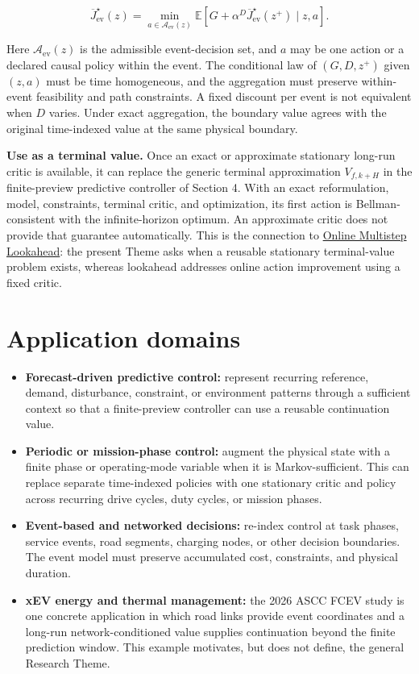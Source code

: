 \documentclass[a4paper]{article}
\begin{document}
\begin{equation}
  \overline J_{\mathrm{ev}}^\star(z)
  =
  \min_{a\in\mathcal A_{\mathrm{ev}}(z)}
  \mathbb E
  \!\left[
  G
  +
  \alpha^D\overline J_{\mathrm{ev}}^\star(z^+)
  \mid z,a
  \right].
\end{equation}

Here $\mathcal A_{\mathrm{ev}}(z)$ is the admissible event-decision set, and
$a$ may be one action or a declared causal policy within the event. The
conditional law of $(G,D,z^+)$ given $(z,a)$ must be time homogeneous, and the
aggregation must preserve within-event feasibility and path constraints. A
fixed discount per event is not equivalent when $D$ varies. Under exact
aggregation, the boundary value agrees with the original time-indexed value at
the same physical boundary.

\textbf{Use as a terminal value.} Once an exact or approximate stationary
long-run critic is available, it can replace the generic terminal
approximation $V_{f,k+H}$ in the finite-preview predictive controller of
Section 4. With an exact reformulation, model,
constraints, terminal critic, and optimization, its first action is
Bellman-consistent with the infinite-horizon optimum. An approximate critic
does not provide that guarantee automatically. This is the connection to
\href{https://kaist-mic-lab.github.io/research/research_themes/02_online_multistep_lookahead/}{Online Multistep Lookahead}:
the present Theme asks when a reusable stationary terminal-value problem
exists, whereas lookahead addresses online action improvement using a fixed
critic.

\section{Application domains}

\begin{itemize}
  \item \textbf{Forecast-driven predictive control:} represent recurring
  reference, demand, disturbance, constraint, or environment patterns through
  a sufficient context so that a finite-preview controller can use a reusable
  continuation value.
  \item \textbf{Periodic or mission-phase control:} augment the physical state
  with a finite phase or operating-mode variable when it is Markov-sufficient.
  This can replace separate time-indexed policies with one stationary critic
  and policy across recurring drive cycles, duty cycles, or mission phases.
  \item \textbf{Event-based and networked decisions:} re-index control at task
  phases, service events, road segments, charging nodes, or other decision
  boundaries. The event model must preserve accumulated cost, constraints, and
  physical duration.
  \item \textbf{xEV energy and thermal management:} the 2026 ASCC FCEV study
  is one concrete application in which road links provide event coordinates
  and a long-run network-conditioned value supplies continuation beyond the
  finite prediction window. This example motivates, but does not define, the
  general Research Theme.
\end{itemize}
\end{document}
